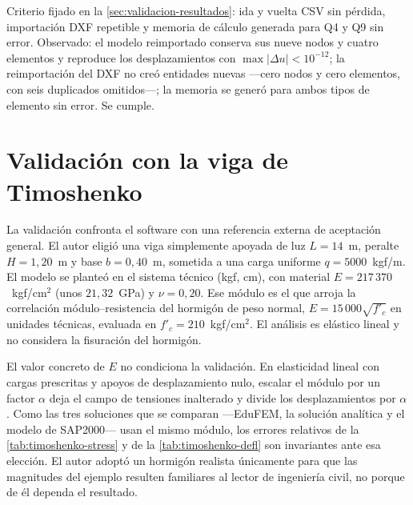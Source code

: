 Criterio fijado en la \autoref{sec:validacion-resultados}: ida y vuelta CSV sin pérdida, importación DXF repetible y memoria de cálculo generada para Q4 y Q9 sin error. Observado: el modelo reimportado conserva sus nueve nodos y cuatro elementos y reproduce los desplazamientos con $\max|\Delta u| < 10^{-12}$; la reimportación del DXF no creó entidades nuevas —cero nodos y cero elementos, con seis duplicados omitidos—; la memoria se generó para ambos tipos de elemento sin error. Se cumple.

\section{Validación con la viga de Timoshenko}
\label{sec:timoshenko}

La validación confronta el software con una referencia externa de aceptación general. El autor eligió una viga simplemente apoyada de luz $L = 14$~m, peralte $H = 1{,}20$~m y base $b = 0{,}40$~m, sometida a una carga uniforme $q = 5000$~kgf/m. El modelo se planteó en el sistema técnico (kgf, cm), con material $E = 217\,370$~kgf/cm$^2$ (unos $21{,}32$~GPa) y $\nu = 0{,}20$. Ese módulo es el que arroja la correlación módulo--resistencia del hormigón de peso normal, $E = 15\,000\sqrt{f'_c}$ en unidades técnicas, evaluada en $f'_c = 210$~kgf/cm$^2$. El análisis es elástico lineal y no considera la fisuración del hormigón.

El valor concreto de $E$ no condiciona la validación. En elasticidad lineal con cargas prescritas y apoyos de desplazamiento nulo, escalar el módulo por un factor $\alpha$ deja el campo de tensiones inalterado y divide los desplazamientos por $\alpha$. Como las tres soluciones que se comparan ---EduFEM, la solución analítica y el modelo de SAP2000--- usan el mismo módulo, los errores relativos de la \autoref{tab:timoshenko-stress} y de la \autoref{tab:timoshenko-defl} son invariantes ante esa elección. El autor adoptó un hormigón realista únicamente para que las magnitudes del ejemplo resulten familiares al lector de ingeniería civil, no porque de él dependa el resultado.

